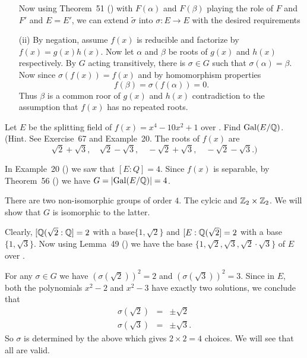 \begin{myenumerate}
\begin{itemize}
   Now using Theorem~51 (\cite{Rotman98}) with
   \(F(\alpha)\) and \(F(\beta)\) playing the role of $F$ and $F'$
   and \(E=E'\), we can extend \(\tilde{\sigma}\) into \(\sigma:E\rightarrow E\)
   with the desired requirements

 \item[(ii)]
   By negation, assume \(f(x)\) is reducible and factorize by
   \(f(x)=g(x)h(x)\).
   Now let \(\alpha\) and \(\beta\)
   be roots of \(g(x)\) and \(h(x)\) respectively.
   By $G$ acting transitively, there is \(\sigma\in G\) such that
   \(\sigma(\alpha)=\beta\). Now since \(\sigma(f(x))=f(x)\) and
   by homomorphism properties
   \begin{equation*}
   f(\beta) = \sigma(f(\alpha)) = 0.
   \end{equation*}
   Thus \(\beta\)  is a common roor of  \(g(x)\) and \(h(x)\)
   contradiction to the assumption that \(f(x)\) has no repeated roots.
\end{itemize}

\item
\begin{excopy}
Let $E$ be the splitting field of \(f(x)=x^4-10x^2+1\) over \Q.
Find \(\mathop{\rm Gal}\nolimits(E/\mathbb{Q})\).
(Hint. See Exercise~67 and Example~20. The roots of \(f(x)\) are
\[
  \sqrt{2}+\sqrt{3},\quad
  \sqrt{2}-\sqrt{3},\quad
  -\sqrt{2}+\sqrt{3},\quad
  -\sqrt{2}-\sqrt{3}.\textrm{)}\]
\end{excopy}

In Example~20 (\cite{Rotman98}) we saw that \([E:Q]=4\).
Since \(f(x)\) is separable, by Theorem~56 (\cite{Rotman98})
we have \(G=\left|\mathop{\rm Gal}\nolimits(E/\mathbb{Q})\right|=4\).


There are two non-isomorphic groups of order $4$.
The cylcic  and \(\mathbb{Z}_2\times\mathbb{Z}_2\). We will show that
$G$ is isomorphic to the latter.

Clearly, \([\mathbb{Q}(\sqrt{2}:\mathbb{Q}]=2\) with a base\(\{1,\sqrt{2}\}\)
and \([E:\mathbb{Q}(\sqrt{2}]=2\) with a base\(\{1,\sqrt{3}\}\).
Now using Lemma~49 (\cite{Rotman98}) we have
the base \(\{1, \sqrt{2}, \sqrt{3}, \sqrt{2}\cdot\sqrt{3}\}\)
of $E$ over \Q.

For any \(\sigma\in G\) we have
  \(\left(\sigma(\sqrt{2})\right)^2 = 2\)
and
  \(\left(\sigma(\sqrt{3})\right)^2 = 3\).
Since in $E$, both the polynomials \(x^2-2\) and \(x^2-3\)
have exactly two solutions, we conclude that
\begin{eqnarray} \label{eq:sigma23}
\sigma(\sqrt{2}) & = & \pm\sqrt{2} \\
\sigma(\sqrt{3}) & = & \pm\sqrt{3}.
\end{eqnarray}
So \(\sigma\) is determined by the above which gives \(2\times 2=4\) choices.
We will see that all are valid.


\end{myenumerate}
